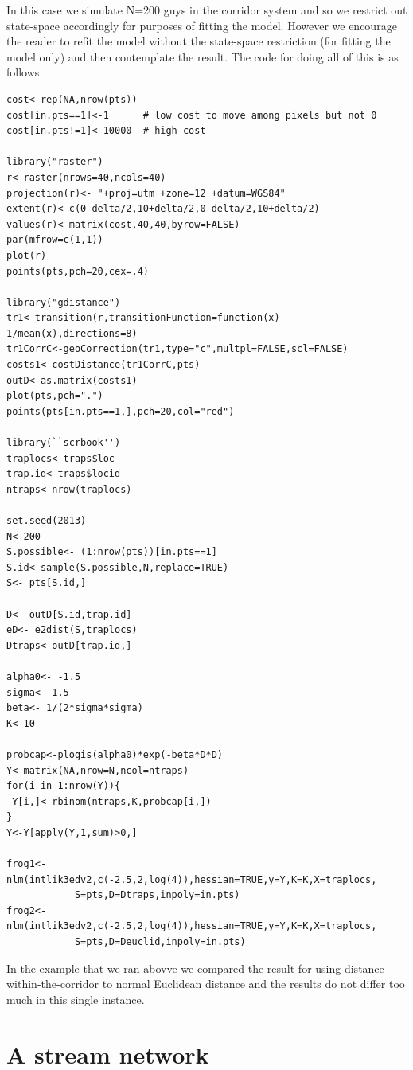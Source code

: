 In this case we simulate N=200 guys in the corridor system and so we
restrict out state-space accordingly for purposes of fitting the
model. However we encourage the reader to refit the model without the
state-space restriction (for fitting the model only) and then
contemplate the result.  The code for doing all of this is as follows

{\small 
\begin{verbatim}
cost<-rep(NA,nrow(pts))
cost[in.pts==1]<-1      # low cost to move among pixels but not 0
cost[in.pts!=1]<-10000  # high cost 

library("raster")
r<-raster(nrows=40,ncols=40)
projection(r)<- "+proj=utm +zone=12 +datum=WGS84"
extent(r)<-c(0-delta/2,10+delta/2,0-delta/2,10+delta/2)
values(r)<-matrix(cost,40,40,byrow=FALSE)
par(mfrow=c(1,1))
plot(r)
points(pts,pch=20,cex=.4)

library("gdistance")
tr1<-transition(r,transitionFunction=function(x) 1/mean(x),directions=8)
tr1CorrC<-geoCorrection(tr1,type="c",multpl=FALSE,scl=FALSE)
costs1<-costDistance(tr1CorrC,pts)
outD<-as.matrix(costs1)
plot(pts,pch=".")
points(pts[in.pts==1,],pch=20,col="red")

library(``scrbook'')
traplocs<-traps$loc
trap.id<-traps$locid
ntraps<-nrow(traplocs)

set.seed(2013)
N<-200
S.possible<- (1:nrow(pts))[in.pts==1]
S.id<-sample(S.possible,N,replace=TRUE)
S<- pts[S.id,]

D<- outD[S.id,trap.id]
eD<- e2dist(S,traplocs)
Dtraps<-outD[trap.id,]

alpha0<- -1.5
sigma<- 1.5
beta<- 1/(2*sigma*sigma)
K<-10

probcap<-plogis(alpha0)*exp(-beta*D*D)
Y<-matrix(NA,nrow=N,ncol=ntraps)
for(i in 1:nrow(Y)){
 Y[i,]<-rbinom(ntraps,K,probcap[i,])
}
Y<-Y[apply(Y,1,sum)>0,]

frog1<-nlm(intlik3edv2,c(-2.5,2,log(4)),hessian=TRUE,y=Y,K=K,X=traplocs,
            S=pts,D=Dtraps,inpoly=in.pts)
frog2<-nlm(intlik3edv2,c(-2.5,2,log(4)),hessian=TRUE,y=Y,K=K,X=traplocs,
            S=pts,D=Deuclid,inpoly=in.pts)
\end{verbatim}
}

In the example that we ran abovve we compared the result for using
distance-within-the-corridor to normal Euclidean distance and the
results do not differ too much in this single instance. 



\section{A stream network}

